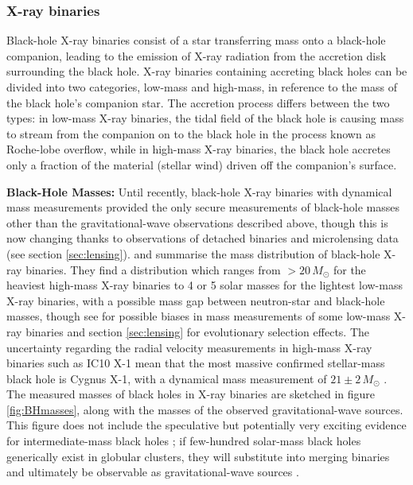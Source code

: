\documentclass[review]{elsarticle}
\begin{document}
\subsubsection{X-ray binaries}\label{sec:XRB}

Black-hole X-ray binaries consist of a star transferring mass onto a black-hole companion, leading to the emission of X-ray radiation from the accretion disk surrounding the black hole.  X-ray binaries containing accreting black holes can be divided into two categories, low-mass and high-mass, in reference to the mass of the black hole's companion star. The accretion process differs between the two types: in low-mass X-ray binaries, the tidal field of the black hole is causing mass to stream from the companion on to the black hole in the process known as Roche-lobe overflow, while in high-mass X-ray binaries, the black hole accretes only a fraction of the material (stellar wind) driven off the companion's surface.

\textbf{Black-Hole Masses:} 
Until recently, black-hole X-ray binaries with dynamical mass measurements provided the only secure measurements of black-hole masses other than the gravitational-wave observations described above, though this is now changing thanks to observations of detached binaries and microlensing data (see section \ref{sec:lensing}).  \citet{Ozel:2010} and \citet{Farr:2011} summarise the mass distribution of black-hole X-ray binaries.  They find a distribution which ranges from $> 20\, M_\odot$ for the heaviest high-mass X-ray binaries to 4 or 5 solar masses for the lightest low-mass X-ray binaries, with a possible mass gap between neutron-star and black-hole masses, though see \cite{Kreidberg:2012} for possible biases in mass measurements of some low-mass X-ray binaries and section \ref{sec:lensing} for evolutionary selection effects.  The uncertainty regarding the radial velocity measurements in high-mass X-ray binaries such as IC10 X-1 \citep{Laycock:2015} mean that the most massive confirmed stellar-mass black hole is Cygnus X-1, with a dynamical mass measurement of $21 \pm 2\, M_\odot$ \citep{MillerJones:2021}.   The measured masses of black holes in X-ray binaries are sketched in figure \ref{fig:BHmasses}, along with the masses of the observed gravitational-wave sources.  This figure does not include the speculative but potentially very exciting evidence for intermediate-mass black holes \citep{MillerColbert:2004,Greene:2019,Paynter:2021}; if few-hundred solar-mass black holes generically exist in globular clusters, they will substitute into merging binaries and ultimately be observable as gravitational-wave sources \citep[e.g.,][]{Mandel:2008,IMBBH:O1}.
\end{document}
